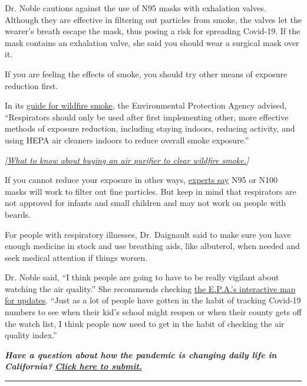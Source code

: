 Dr. Noble cautions against the use of N95 masks with exhalation valves.
Although they are effective in filtering out particles from smoke, the
valves let the wearer's breath escape the mask, thus posing a risk for
spreading Covid-19. If the mask contains an exhalation valve, she said
you should wear a surgical mask over it.

If you are feeling the effects of smoke, you should try other means of
exposure reduction first.

In its \href{https://www3.epa.gov/airnow/wildfire_may2016.pdf}{guide for
wildfire smoke}, the Environmental Protection Agency advised,
``Respirators should only be used after first implementing other, more
effective methods of exposure reduction, including staying indoors,
reducing activity, and using HEPA air cleaners indoors to reduce overall
smoke exposure.''

\emph{{[}}\href{https://www.nytimes3xbfgragh.onion/2017/10/24/smarter-living/what-to-know-before-buying-an-air-purifier.html}{\emph{What
to know about buying an air purifier to clear wildfire
smoke.}}\emph{{]}}

If you cannot reduce your exposure in other ways,
\href{https://www.doh.wa.gov/CommunityandEnvironment/AirQuality/SmokeFromFires\#q7}{experts
say} N95 or N100 masks will work to filter out fine particles. But keep
in mind that respirators are not approved for infants and small children
and may not work on people with beards.

For people with respiratory illnesses, Dr. Daignault said to make sure
you have enough medicine in stock and use breathing aids, like
albuterol, when needed and seek medical attention if things worsen.

Dr. Noble said, ``I think people are going to have to be really vigilant
about watching the air quality.'' She recommends checking
\href{https://gispub.epa.gov/airnow/}{the E.P.A.'s interactive map for
updates}. ``Just as a lot of people have gotten in the habit of tracking
Covid-19 numbers to see when their kid's school might reopen or when
their county gets off the watch list, I think people now need to get in
the habit of checking the air quality index.''

\emph{\textbf{Have a question about how the pandemic is changing daily
life in California?}}
\textbf{\href{https://www.nytimes3xbfgragh.onion/2020/06/17/us/coronavirus-california-life.html}{\emph{Click
here to submit.}}}

\begin{center}\rule{0.5\linewidth}{\linethickness}\end{center}

